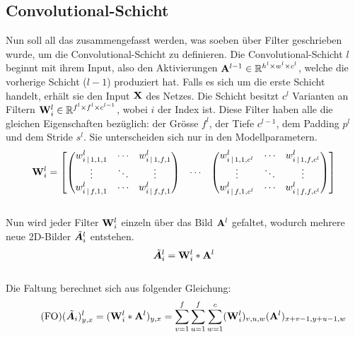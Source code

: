 \subsection{Convolutional-Schicht}
Nun soll all das zusammengefasst werden, was soeben über Filter geschrieben
wurde, um die Convolutional-Schicht zu definieren.
\para{}
Die Convolutional-Schicht $l$ beginnt mit ihrem Input, also den
Aktivierungen $\mathbf{A}^{l-1} \in \mathbb{R}^{h^l \times w^l \times c^l}$, welche die vorherige Schicht ($l-1$) produziert hat.
Falls es sich um die erste Schicht handelt, erhält sie den Input $\mathbf{X}$ des Netzes.
\para{}
Die Schicht besitzt $c^l$ Varianten an Filtern $\mathbf{W}^l_i \in
\mathbb{R}^{f^l \times f^l \times c^{l-1}}$, wobei $i$ der Index ist. Diese Filter haben alle die gleichen
Eigenschaften bezüglich: der Grösse $f^l$, der Tiefe $c^{l-1}$, dem Padding
$p^l$ und dem Stride $s^l$. Sie unterscheiden sich nur in den Modellparametern.
\\
\begin{equation*}
  \mathbf{W}^l_i =
  \begin{bmatrix}
    \begin{pmatrix}
      w_{i\,|\,1,1,1}^l & \cdots & w_{i\,|\,1,f,1}^l \\
      \vdots & \ddots & \vdots \\
      w_{i\,|\,f,1,1}^l & \cdots & w_{i\,|\,f,f,1}^l
    \end{pmatrix}
    & \cdots &
    \begin{pmatrix}
      w_{i\,|\,1,1,c^l}^l & \cdots & w_{i\,|\,1,f,c^l}^l \\
      \vdots & \ddots & \vdots \\
      w_{i\,|\,f,1,c^l}^l & \cdots & w_{i\,|\,f,f,c^l}^l
    \end{pmatrix}
  \end{bmatrix}
\end{equation*}
\\
Nun wird jeder Filter $\mathbf{W}_i^l$ einzeln über das Bild
$\mathbf{A}^l$ gefaltet, wodurch mehrere neue 2D-Bilder $\tilde{\bm{A}}_i^l$ entstehen.
\\
\begin{equation}
  \tilde{\bm{A}}_i^l = \mathbf{W}_i^l * \mathbf{A}^l
\end{equation}
\\
Die Faltung berechnet sich aus folgender Gleichung:
\\
\begin{equation}\tag{FO}
  (\tilde{\bm{A}}_i)_{y,x}^l = (\mathbf{W}_i^l * \mathbf{A}^l)_{y,x} = \sum_{v=1}^{f} \sum_{u=1}^{f} \sum_{w=1}^c (\mathbf{W}^l_i)_{v,u,w} (\mathbf{A}^l)_{x+v-1,y+u-1,w}
\end{equation}
